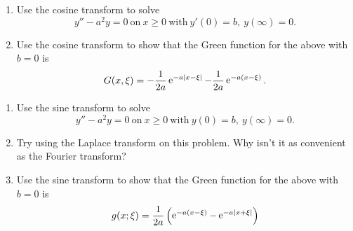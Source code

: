 {\begin{Exercise}
\end{Exercise}







\begin{Exercise}
  \label{exercise ode ft fct y-a2y=0}
  \begin{enumerate}
  \item
    Use the cosine transform to solve
    \[
    y'' - a^2 y = 0\ \mathrm{on}\ x \geq 0\ \mathrm{with}\ y'(0) = b,\ y(\infty) = 0.
    \]
  \item
    Use the cosine transform to show that the Green function for the above
    with $b = 0$ is
    \[
    G(x,\xi) = - \frac{1}{2 a} \mathop{\mathrm{e}}\nolimits^{- a |x - \xi|}
    - \frac{1}{2 a} \mathop{\mathrm{e}}\nolimits^{- a (x - \xi)}.
    \]
  \end{enumerate}

\end{Exercise}






\begin{Exercise}
  \label{exercise ode ft fst y-a2y=0}
  \begin{enumerate}
  \item  
    Use the sine transform to solve
    \[
    y'' - a^2 y = 0\ \mathrm{on}\ x \geq 0\ \mathrm{with}\ y(0) = b,\ y(\infty) = 0.
    \]
  \item  
    Try using the Laplace transform on this problem. Why isn't it as 
    convenient as the Fourier transform?
  \item
    Use the sine transform to show that the Green function for the above
    with $b = 0$ is
    \[
    g(x; \xi) = \frac{1}{2 a} \left( 
      \mathop{\mathrm{e}}\nolimits^{- a (x - \xi)} - \mathop{\mathrm{e}}\nolimits^{- a |x + \xi|} \right)
    \]
  \end{enumerate}

\end{Exercise}






}
